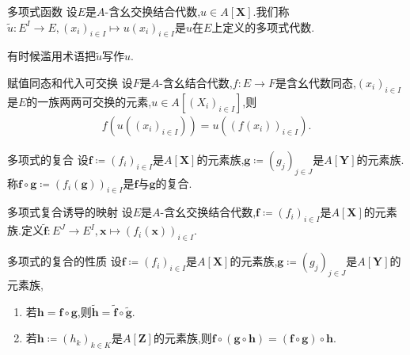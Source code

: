\begin{definition}{多项式函数}{}
	设$E$是$A$-含幺交换结合代数,$u\in A[\mathbf{X}]$.我们称$\tilde{u}:E^{I}\to E,\left(x_{i}\right)_{i\in I}\mapsto u\left(x_{i}\right)_{i\in I}$是$u$在$E$上定义的多项式代数.
\end{definition}

\begin{remark}{}{}
	有时候滥用术语把$\tilde{u}$写作$u$.
\end{remark}

\begin{proposition}{赋值同态和代入可交换}{}
	设$F$是$A$-含幺结合代数,$f:E\to F$是含幺代数同态,$\left(x_{i}\right)_{i\in I}$是$E$的一族两两可交换的元素,$u\in A[\left(X_{i}\right)_{i\in I}]$,则
	\begin{align*}
		f\left(u\left(\left(x_{i}\right)_{i\in I}\right)\right)=u\left(\left(f\left(x_{i}\right)\right)_{i\in I}\right).
	\end{align*}
\end{proposition}

\begin{definition}{多项式的复合}{}
	设$\mathbf{f}\coloneq\left(f_{i}\right)_{i\in I}$是$A[\mathbf{X}]$的元素族,$\mathbf{g}\coloneq\left(g_{j}\right)_{j\in J}$是$A[\mathbf{Y}]$的元素族.称$\mathbf{f}\circ\mathbf{g}\coloneq\left(f_{i}\left(\mathbf{g}\right)\right)_{i\in I}$是$\mathbf{f}$与$\mathbf{g}$的复合.
\end{definition}

\begin{definition}{多项式复合诱导的映射}{}
	设$E$是$A$-含幺交换结合代数,$\mathbf{f}\coloneq\left(f_{i}\right)_{i\in I}$是$A[\mathbf{X}]$的元素族.定义$\tilde{\mathbf{f}}:E^{J}\to E^{I},\mathbf{x}\mapsto\left(f_{i}\left(\mathbf{x}\right)\right)_{i\in I}$.
\end{definition}

\begin{proposition}{多项式的复合的性质}{}
	设$\mathbf{f}\coloneq\left(f_{i}\right)_{i\in I}$是$A[\mathbf{X}]$的元素族,$\mathbf{g}\coloneq\left(g_{j}\right)_{j\in J}$是$A[\mathbf{Y}]$的元素族,
	\begin{enumerate}
		\item 若$\mathbf{h}=\mathbf{f}\circ\mathbf{g}$,则$\tilde{\mathbf{h}}=\tilde{\mathbf{f}}\circ\tilde{\mathbf{g}}$.
		\item 若$\mathbf{h}\coloneq\left(h_{k}\right)_{k\in K}$是$A[\mathbf{Z}]$的元素族,则$\mathbf{f}\circ\left(\mathbf{g}\circ\mathbf{h}\right)=\left(\mathbf{f}\circ\mathbf{g}\right)\circ\mathbf{h}$.
	\end{enumerate}
\end{proposition}

